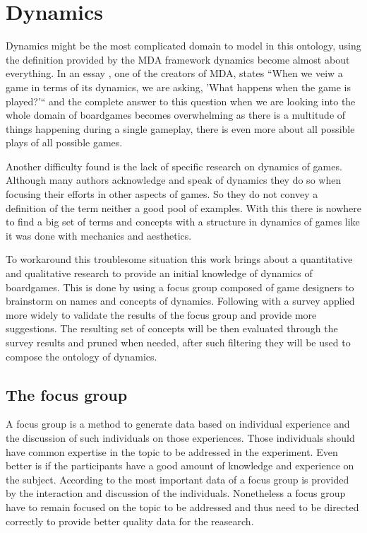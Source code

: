 \section{Dynamics}
Dynamics might be the most complicated domain to model in this ontology, using the definition provided by the MDA framework dynamics become almost about everything. In an essay \cite{leblanc2006tools}, one of the creators of MDA, states ``When we veiw a game in terms of its dynamics, we are asking, 'What happens when the game is played?'`` and the complete answer to this question when we are looking into the whole domain of boardgames becomes overwhelming as there is a multitude of things happening during a single gameplay, there is even more about all possible plays of all possible games. 

Another difficulty found is the lack of specific research on dynamics of games. Although many authors acknowledge and speak of dynamics they do so when focusing their efforts in other aspects of games. So they do not convey a definition of the term neither a good pool of examples. With this there is nowhere to find a big set of terms and concepts with a structure in dynamics of games like it was done with mechanics and aesthetics.

To workaround this troublesome situation this work brings about a quantitative and qualitative research to provide an initial knowledge of dynamics of boardgames. This is done by using a focus group composed of game designers to brainstorm on names and concepts of dynamics. Following with a survey applied more widely to validate the results of the focus group and provide more suggestions. The resulting set of concepts will be then evaluated through the survey results and pruned when needed, after such filtering they will be used to compose the ontology of dynamics.

\subsection{The focus group}

A focus group is a method to generate data based on individual experience and the discussion of such individuals on those experiences. Those individuals should have common expertise in the topic to be addressed in the experiment. Even better is if the participants have a good amount of knowledge and experience on the subject. According to \cite{jenny_methodologyfocusgroup_1994} the most important data of a focus group is provided by the interaction and discussion of the individuals. Nonetheless a focus group have to remain focused on the topic to be addressed and thus need to be directed correctly to provide better quality data for the reasearch. \citep{liamputtong_focusgroup_2011,rabiee_focus-group_2004,jenny_methodologyfocusgroup_1994}

